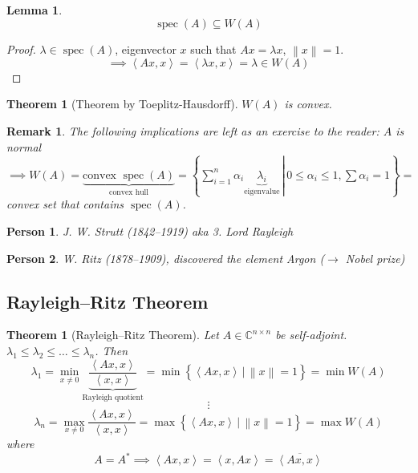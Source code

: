 \documentclass{article}
\newcounter{lecref}[section]
\numberwithin{lecref}{section}
\newtheorem{theorem}[lecref]{Theorem}
\newtheorem{lemma}[lecref]{Lemma}
\newtheorem*{Remark}{Remark}
\newtheorem*{person}{Person}
\newcommand{\setdef}[2]{\left\{\left.#1\,\right|\,#2\right\}}
\newcommand{\angel}[1]{\left\langle#1\right\rangle}
\newcommand{\norm}[1]{\left\|#1\right\|}
\begin{document}
\begin{lemma}
  \[ \operatorname{spec}(A) \subseteq W(A) \]
\end{lemma}
\begin{proof}
  $\lambda \in \operatorname{spec}(A)$, eigenvector $x$ such that $Ax = \lambda x$, $\norm{x} = 1$.
  \[ \implies \angel{Ax, x} = \angel{\lambda x, x} = \lambda \in W(A) \]
\end{proof}

\begin{theorem}[Theorem by Toeplitz-Hausdorff]
  $W(A)$ is convex.
\end{theorem}
\begin{Remark}
  The following implications are left as an exercise to the reader:
  $A$ is normal $\implies W(A) = \underbrace{\text{convex } \operatorname{spec}(A)}_{\text{convex hull}} = \setdef{\sum_{i=1}^n \alpha_i \underbrace{\lambda_i}_{\text{eigenvalue}}}{0 \leq \alpha_i \leq 1, \sum \alpha_i = 1} =$ convex set that contains $\operatorname{spec}(A)$.
\end{Remark}

\begin{person}
  J. W. Strutt (1842--1919) aka 3. Lord Rayleigh
\end{person}

\begin{person}
  W. Ritz (1878--1909), discovered the element Argon ($\rightarrow$ Nobel prize)
\end{person}

\subsection{Rayleigh--Ritz Theorem}

\begin{theorem}[Rayleigh--Ritz Theorem] %
  \label{rrthm}
  Let $A \in \mathbb C^{n \times n}$ be self-adjoint.
  $\lambda_1 \leq \lambda_2 \leq \dots \leq \lambda_n$.
  Then
  \[ \lambda_1 = \min_{x \neq 0}\underbrace{\frac{\angel{Ax, x}}{\angel{x, x}}}_{\text{Rayleigh quotient}} = \min\setdef{\angel{Ax, x}}{\norm{x} = 1} = \min{W(A)} \]
  \[ \vdots \]
  \[ \lambda_n = \max_{x \neq 0}\frac{\angel{Ax, x}}{\angel{x, x}} = \max\setdef{\angel{Ax, x}}{\norm{x} = 1} = \max{W(A)} \]
  where
  \[ A = A^* \implies \angel{Ax, x} = \angel{x, Ax} = \overline{\angel{Ax, x}} \]
\end{theorem}
\end{document}
